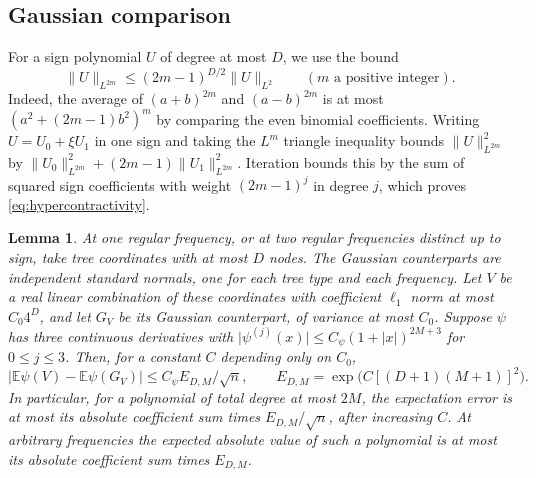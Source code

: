 \documentclass[11pt,letterpaper]{article}
\newtheorem{lemma}{Lemma}[section]
\newcommand{\E}{\mathbb E}
\newcommand{\abs}[1]{\lvert #1\rvert}
\newcommand{\norm}[1]{\lVert #1\rVert}
\begin{document}
\subsection{Gaussian comparison}

For a sign polynomial \(U\) of degree at most \(D\), we use the bound
\begin{equation}\label{eq:hypercontractivity}
 \norm U_{L^{2m}}\le (2m-1)^{D/2}\norm U_{L^2}
 \qquad(m\text{ a positive integer}).
\end{equation}
Indeed, the average of \((a+b)^{2m}\) and \((a-b)^{2m}\) is at most
\((a^2+(2m-1)b^2)^m\) by comparing the even binomial coefficients.
Writing \(U=U_0+\xi U_1\) in one sign and taking the \(L^m\) triangle
inequality bounds \(\norm U_{L^{2m}}^2\) by
\(\norm{U_0}_{L^{2m}}^2+(2m-1)\norm{U_1}_{L^{2m}}^2\).
Iteration bounds this by the sum of squared sign coefficients with
weight \((2m-1)^j\) in degree \(j\), which proves
\eqref{eq:hypercontractivity}.

\begin{lemma}\label{lem:comparison}
At one regular frequency, or at two regular frequencies distinct up
to sign, take tree coordinates with at most \(D\) nodes. The Gaussian
counterparts are independent standard normals, one for each tree type
and each frequency. Let \(V\) be a real linear combination of these
coordinates with coefficient \(\ell_1\) norm at most \(C_0 4^D\), and
let \(G_V\) be its Gaussian counterpart, of variance at most \(C_0\).
Suppose \(\psi\) has three continuous derivatives with
\(\abs{\psi^{(j)}(x)}\le C_\psi(1+\abs x)^{2M+3}\) for \(0\le j\le3\).
Then, for a constant \(C\) depending only on \(C_0\),
\begin{equation}\label{eq:comparison}
 \abs{\E \psi(V)-\E \psi(G_V)}\le C_\psi E_{D,M}/\sqrt n,
 \qquad E_{D,M}=\exp\!\bigl(C[(D+1)(M+1)]^2\bigr).
\end{equation}
In particular, for a polynomial of total degree at most \(2M\), the
expectation error is at most its absolute coefficient sum times
\(E_{D,M}/\sqrt n\), after increasing \(C\). At arbitrary frequencies
the expected absolute value of such a polynomial is at most its
absolute coefficient sum times \(E_{D,M}\).
\end{lemma}
\end{document}
